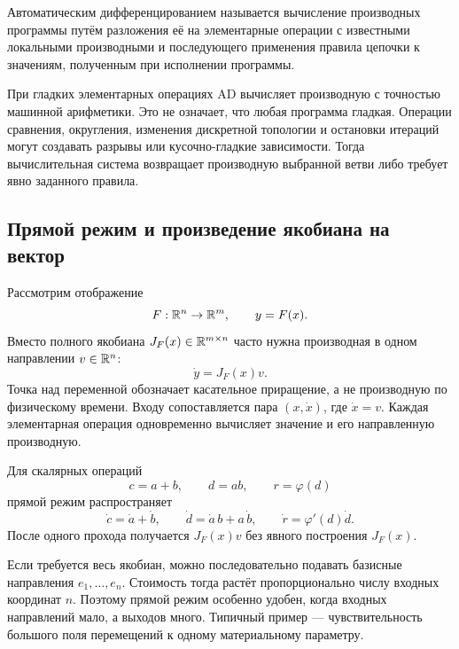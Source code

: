\begin{definition}
Автоматическим дифференцированием называется вычисление производных программы путём разложения её на элементарные операции с известными локальными производными и последующего применения правила цепочки к значениям, полученным при исполнении программы.
\end{definition}

При гладких элементарных операциях AD вычисляет производную с точностью машинной арифметики. Это не означает, что любая программа гладкая. Операции сравнения, округления, изменения дискретной топологии и остановки итераций могут создавать разрывы или кусочно-гладкие зависимости. Тогда вычислительная система возвращает производную выбранной ветви либо требует явно заданного правила.

\subsection{Прямой режим и произведение якобиана на вектор}
Рассмотрим отображение
\begin{equation}
 F:\mathbb{R}^n\to\mathbb{R}^m,
 \qquad
 y=F(x).
\end{equation}
Вместо полного якобиана $J_F(x)\in\mathbb{R}^{m\times n}$ часто нужна производная в одном направлении $v\in\mathbb{R}^n$:
\begin{equation}
 \dot y
 =
 J_F(x)v.
\end{equation}
Точка над переменной обозначает касательное приращение, а не производную по физическому времени. Входу сопоставляется пара $(x,\dot x)$, где $\dot x=v$. Каждая элементарная операция одновременно вычисляет значение и его направленную производную.

Для скалярных операций
\begin{equation}
 c=a+b,
 \qquad
 d=ab,
 \qquad
 r=\varphi(d)
\end{equation}
прямой режим распространяет
\begin{equation}
 \dot c=\dot a+\dot b,
 \qquad
 \dot d=\dot a\,b+a\,\dot b,
 \qquad
 \dot r=\varphi'(d)\dot d.
\end{equation}
После одного прохода получается $J_F(x)v$ без явного построения $J_F(x)$.

Если требуется весь якобиан, можно последовательно подавать базисные направления $e_1,\ldots,e_n$. Стоимость тогда растёт пропорционально числу входных координат $n$. Поэтому прямой режим особенно удобен, когда входных направлений мало, а выходов много. Типичный пример --- чувствительность большого поля перемещений к одному материальному параметру.

